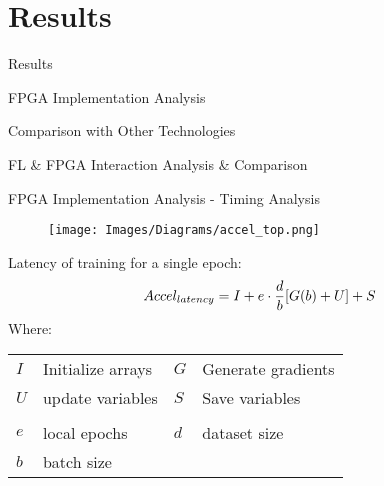 \setlength{\parskip}{\baselineskip}
\section{Results}

\begin{frame}
	\huge Results
\end{frame}

\begin{frame}
	FPGA Implementation Analysis

    Comparison with Other Technologies
    
    FL \& FPGA Interaction Analysis \& Comparison
\end{frame}



\begin{frame}{FPGA Implementation Analysis - Timing Analysis}
	\begin{minipage}{0.25\textwidth}
    	\begin{figure}[H]
            \centering
    		\texttt{[image: Images/Diagrams/accel\_top.png]}
    	\end{figure}%
	\end{minipage}%
	\begin{minipage}{0.75\textwidth}
	Latency of training for a single epoch:
        \begin{equation*}
            \small
            Accel_{latency} = I + e \cdot \frac{d}{b} [ G(b) + U ] + S
        \end{equation*}
        Where:
        \begin{table}[H]
            \center
            \small
            \begin{tabular}
                { l @{ $=$ } l | l @{ $=$ } l }
                $I$ & Initialize arrays & $G$ & Generate gradients\\
                $U$ & update variables  & $S$ & Save variables\\
                \multicolumn{4}{c}{}\\
                $e$ & local epochs & $d$ & dataset size\\
                $b$ & batch size\\
            \end{tabular}
        \end{table}
	\end{minipage}%
\end{frame}

